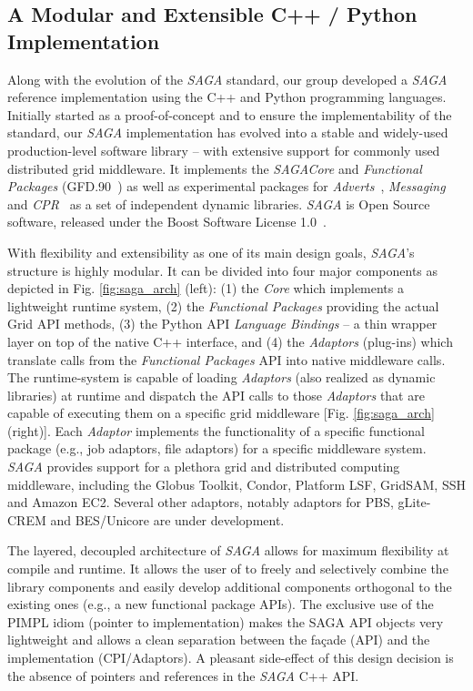 \documentclass[a4paper,10pt]{article}
\newcommand{\I}[1]{\textit{#1}}
\newcommand{\sagaspec}{\textit{SAGA}\xspace}
\newcommand{\sagaimpl}{\textit{SAGA}\xspace}
\newcommand{\spec}{\sagaspec}
\newcommand{\impl}{\sagaimpl}
\begin{document}
\vspace{-0.8em}


\subsection*{A Modular and Extensible C++ / Python Implementation}
\vspace{-0.5em}

 Along with the evolution of the \spec standard, our group developed a
 \impl reference implementation using the C++ and Python programming
 languages. Initially started as a proof-of-concept and to ensure the
 implementability of the standard, our \impl implementation has
 evolved into a stable and widely-used production-level software
 library -- with extensive support for commonly used distributed grid
 middleware.  It implements the \spec \textit{Core} and
 \textit{Functional Packages} (GFD.90~\cite{ogf-gfd-90}) as well as
 experimental packages for \textit{Adverts}~\cite{ogf-gwd-r-p-xx},
 \textit{Messaging}\cite{ogf-gwd-r-94} and
 \textit{CPR}~\cite{ogf-gwd-r-96} as a set of independent dynamic
 libraries. \impl is Open Source software, released under the Boost
 Software License 1.0~\cite{boost_license_web}. 

 With flexibility and extensibility as one of its main design goals,
 \impl's structure is highly modular. It can be divided into four
 major components as depicted in Fig. \ref{fig:saga_arch} (left): (1)
 the \I{Core} which implements a lightweight runtime system, (2) the
 \I{Functional Packages} providing the actual Grid API methods, (3)
 the Python API \I{Language Bindings} -- a thin wrapper layer on top
 of the native C++ interface, and (4) the \I{Adaptors} (plug-ins)
 which translate calls from the \I{Functional Packages} API into
 native middleware calls.  The runtime-system is capable of loading
 \I{Adaptors} (also realized as dynamic libraries) at runtime and
 dispatch the API calls to those \I{Adaptors} that are capable of
 executing them on a specific grid middleware [Fig.
 \ref{fig:saga_arch} (right)]. Each \I{Adaptor} implements the
 functionality of a specific functional package (e.g., job adaptors,
 file adaptors) for a specific middleware system. \impl provides
 support for a plethora grid and distributed computing middleware,
 including the Globus Toolkit, Condor, Platform LSF, GridSAM, SSH and
 Amazon EC2. Several other adaptors, notably adaptors for PBS,
 gLite-CREM and BES/Unicore are under development. 

 The layered, decoupled architecture of \impl allows for maximum
 flexibility at compile and runtime. It allows the user of to freely
 and selectively combine the library components and easily develop
 additional components orthogonal to the existing ones (e.g., a new
 functional package APIs). The exclusive use of the PIMPL idiom
 (pointer to implementation) makes the SAGA API objects very
 lightweight and allows a clean separation between the fa\c{c}ade
 (API) and the implementation (CPI/Adaptors). A pleasant side-effect
 of this design decision is the absence of pointers and references in
 the \impl C++ API.
\end{document}
